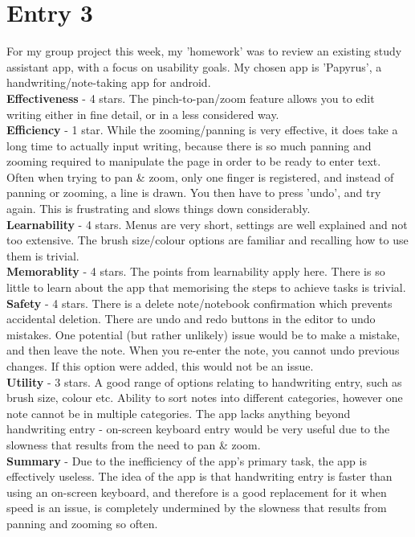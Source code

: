 \documentclass{article}
\begin{document}
\section*{Entry 3}

\noindent For my group project this week, my 'homework' was to review an existing study assistant app, with a focus on usability goals. My chosen app is 'Papyrus', a handwriting/note-taking app for android.
\\\indent \textbf{Effectiveness} - 4 stars. The pinch-to-pan/zoom feature allows you to edit writing either in fine detail, or in a less considered way.
\\\indent \textbf{Efficiency} - 1 star. While the zooming/panning is very effective, it does take a long time to actually input writing, because there is so much panning and zooming required to manipulate the page in order to be ready to enter text. Often when trying to pan \& zoom, only one finger is registered, and instead of panning or zooming, a line is drawn. You then have to press 'undo', and try again. This is frustrating and slows things down considerably.
\\\indent \textbf{Learnability} - 4 stars. Menus are very short, settings are well explained and not too extensive. The brush size/colour options are familiar and recalling how to use them is trivial.
\\\indent \textbf{Memorablity} - 4 stars. The points from learnability apply here. There is so little to learn about the app that memorising the steps to achieve tasks is trivial.
\\\indent \textbf{Safety} - 4 stars. There is a delete note/notebook confirmation which prevents accidental deletion. There are undo and redo buttons in the editor to undo mistakes. One potential (but rather unlikely) issue would be to make a mistake, and then leave the note. When you re-enter the note, you cannot undo previous changes. If this option were added, this would not be an issue.
\\\indent \textbf{Utility} - 3 stars. A good range of options relating to handwriting entry, such as brush size, colour etc. Ability to sort notes into different categories, however one note cannot be in multiple categories. The app lacks anything beyond handwriting entry - on-screen keyboard entry would be very useful due to the slowness that results from the need to pan \& zoom.
\\\indent \textbf{Summary} - Due to the inefficiency of the app's primary task, the app is effectively useless. The idea of the app is that handwriting entry is faster than using an on-screen keyboard, and therefore is a good replacement for it when speed is an issue, is completely undermined by the slowness that results from panning and zooming so often.
\end{document}
